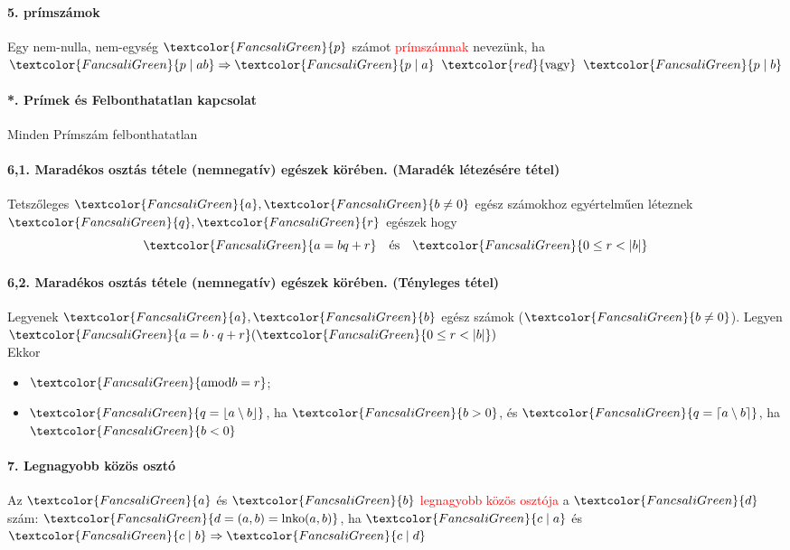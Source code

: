 \documentclass[10pt,a4paper]{article}
\renewcommand{\>}{\rightarrow}
\newcommand{\mmod}[2]{#1  \mid #2}
\newcommand{\red}[1]{\textcolor{red}{#1}}
\newcommand{\gr}[1]{\textcolor{FancsaliGreen}{#1}}
\newenvironment{m}
    {\begin{center}
    \begin{mdframed}[backgroundcolor=FancsaliBlue]
    }
    { 
    \end{mdframed}
    \end{center}
    }
\begin{document}
\paragraph{5. prímszámok}
\begin{m}
Egy nem-nulla, nem-egység $\gr{p}$ számot \red{prímszámnak} nevezünk, ha $\gr{p \;\lvert\; ab} \Rightarrow \gr{p\;\lvert\;a} \;\; \red{\text{vagy}} \; \; \gr{p\;\lvert\;b}$
\end{m}
\paragraph{*. Prímek és Felbonthatatlan kapcsolat}
\begin{m}
Minden Prímszám felbonthatatlan
\end{m}
\paragraph{6,1. Maradékos osztás tétele (nemnegatív) egészek körében. (Maradék létezésére tétel)}
\begin{m}
Tetszőleges $\gr{a},\gr{b \neq 0} $ egész számokhoz egyértelműen léteznek $\gr{q},\gr{r}$ egészek hogy
\[
\gr{a = bq+r } \quad \text{és} \quad \gr{0\leq r<\lvert b \lvert}
\]
\end{m}
\paragraph{6,2. Maradékos osztás tétele (nemnegatív) egészek körében. (Tényleges tétel)}
\begin{m}
Legyenek $\gr{a},\gr{b}$ egész számok ($\gr{b\neq 0}$). Legyen $\gr{a = b\cdot q +r} (\gr{0\leq r < \lvert b \lvert})$ \\
Ekkor
\begin{itemize}
\item $\gr{a \text{mod} b = r}$;
\item $\gr{q = \lfloor a\setminus b\rfloor}$, ha $\gr{b>0}$, és $\gr{q = \lceil a\setminus b \rceil}$, ha $\gr{b<0}$
\end{itemize}
\end{m}
\paragraph{7. Legnagyobb közös osztó }
\begin{m}
Az $\gr{a}$ és $\gr{b}$ \red{legnagyobb közös osztója} a $\gr{d}$ szám: $\gr{d = (a,b)= \text{lnko}(a,b)}$, ha $\gr{c \; \lvert \; a}$ és $\gr{\mmod{c}{b}} \Rightarrow \gr{\mmod{c}{d}}$
\end{m}
\newpage
\end{document}

